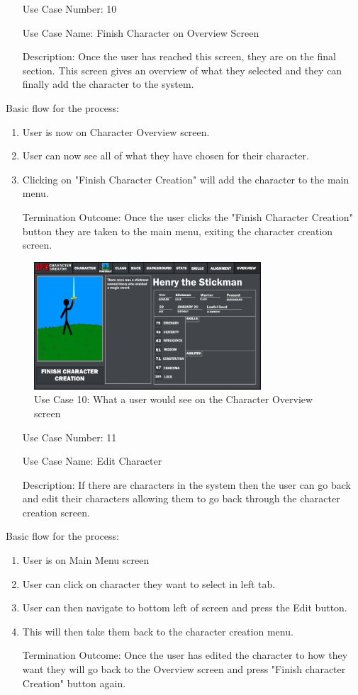 \documentclass[10pt,conference,onecolumn,compsoc]{IEEEtran}
\begin{document}
\begin{itemize}
\item[Use Case Number:] 10
\item[Use Case Name:] Finish Character on Overview Screen
\item[Description:] Once the user has reached this screen, they are on the final section. This screen gives an overview of what they selected and they can finally add the character to the system.
\end{itemize}
Basic flow for the process:
\begin{enumerate}
\item User is now on Character Overview screen.
\item User can now see all of what they have chosen for their character.
\item Clicking on "Finish Character Creation" will add the character to the main menu.
\item[Termination Outcome:] Once the user clicks the "Finish Character Creation" button they are taken to the main menu, exiting the character creation screen.
\end{enumerate}

\begin{figure}[H]
\includegraphics[height=180px, width=320px]{CSCI 352 Interface Mockups/Interface Mockup 5.png}
\caption{Use Case 10: What a user would see on the Character Overview screen}
\centering
\label{mockup5}
\end{figure}

\begin{itemize}
\item[Use Case Number:] 11
\item[Use Case Name:] Edit Character
\item[Description:] If there are characters in the system then the user can go back and edit their characters allowing them to go back through the character creation screen.
\end{itemize}
Basic flow for the process:
\begin{enumerate}
\item User is on Main Menu screen
\item User can click on character they want to select in left tab.
\item User can then navigate to bottom left of screen and press the Edit button.
\item This will then take them back to the character creation menu.
\item[Termination Outcome:] Once the user has edited the character to how they want they will go back to the Overview screen and press "Finish character Creation" button again.
\end{enumerate}
\end{document}
